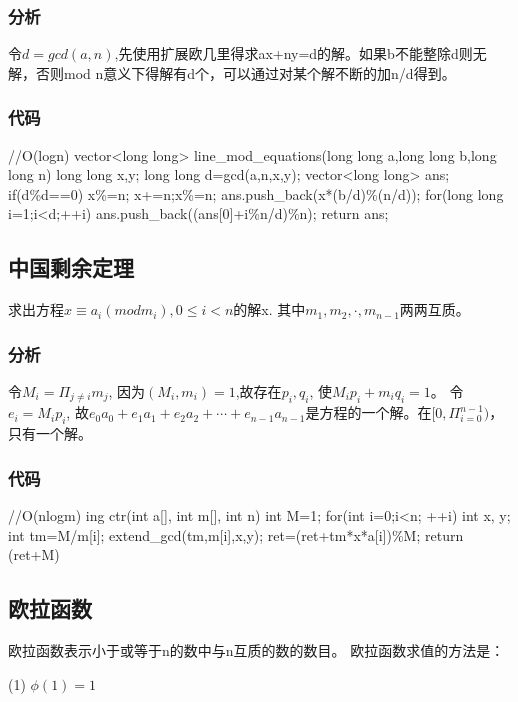 \subsubsection{分析}
令$d=gcd(a,n)$,先使用扩展欧几里得求ax+ny=d的解。如果b不能整除d则无解，否则mod n意义下得解有d个，可以通过对某个解不断的加n/d得到。

\subsubsection{代码}
\begin{Codex}[label=line_mod.c]
	//O(logn)
	vector<long long> line_mod_equations(long long a,long long b,long long n){
		long long x,y;
		long long d=gcd(a,n,x,y);
		vector<long long> ans;
		if(d\%d==0){
			x\%=n; x+=n;x\%=n;
			ans.push_back(x*(b/d)\%(n/d));
			for(long long i=1;i<d;++i)
				ans.push_back((ans[0]+i\%n/d)\%n);
		}
		return ans;
	}
\end{Codex}

\subsection{中国剩余定理}
求出方程$x\equiv a_i(mod m_i),0 \leq i<n$的解x.
其中$m_1,m_2,\cdot,m_{n-1}$两两互质。

\subsubsection{分析}
令$M_i=\Pi_{j\neq i}m_j$, 因为$(M_i,m_i)=1$,故存在$p_i,q_i$, 使$M_ip_i+m_iq_i=1$。
令$e_i=M_ip_i$, 故$e_0a_0+e_1a_1+e_2a_2+\cdots+e_{n-1}a_{n-1}$是方程的一个解。在$[0,\Pi_{i=0}^{n-1})$，只有一个解。

\subsubsection{代码}
\begin{Codex}[label=ctr.c]
	//O(nlogm)
	ing ctr(int a[], int m[], int n){
		int M=1;
		for(int i=0;i<n; ++i){
			int x, y;
			int tm=M/m[i];
			extend_gcd(tm,m[i],x,y);
			ret=(ret+tm*x*a[i])\%M;
		}
		return (ret+M)%
	}
\end{Codex}

\subsection{欧拉函数}
欧拉函数表示小于或等于n的数中与n互质的数的数目。
欧拉函数求值的方法是：

(1) $\phi(1)=1$

